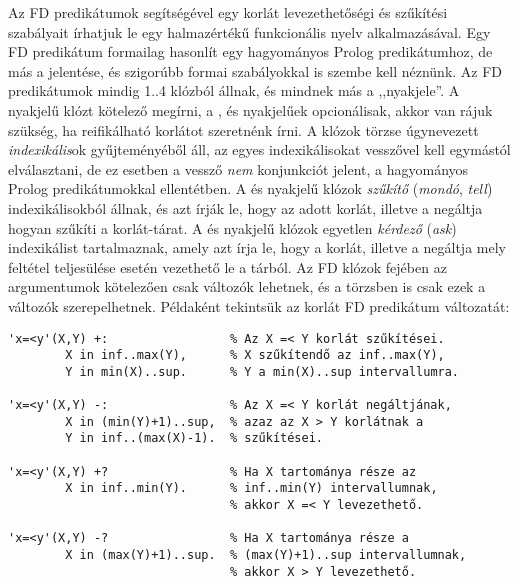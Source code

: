 Az FD predikátumok segítségével egy korlát levezethetőségi és szűkítési szabályait
írhatjuk le egy halmazértékű funkcionális nyelv alkalmazásával. Egy FD predikátum
formailag hasonlít egy hagyományos Prolog predikátumhoz, de más a jelentése, és
szigorúbb formai szabályokkal is szembe kell néznünk.
\br
Az FD predikátumok mindig 1..4 klózból állnak, és mindnek más a ,,nyakjele''. A
\cd{+:} nyakjelű klózt kötelező megírni, a \cd{-:},  és  nyakjelűek
opcionálisak, akkor van rájuk szükség, ha reifikálható korlátot szeretnénk írni.
A klózok törzse úgynevezett \emph{indexikális}ok gyűjteményéből áll, az egyes
indexikálisokat vesszővel kell egymástól elválasztani, de ez esetben a vessző
\emph{nem} konjunkciót jelent, a hagyományos Prolog predikátumokkal ellentétben.
A \cd{+:} és \cd{-:} nyakjelű klózok \emph{szűkítő} (\emph{mondó}, \emph{tell})
indexikálisokból állnak, és azt írják le, hogy az adott korlát, illetve a negáltja
hogyan szűkíti a korlát-tárat. A  és  nyakjelű klózok egyetlen
\emph{kérdező} (\emph{ask}) indexikálist tartalmaznak, amely azt írja le, hogy
a korlát, illetve a negáltja mely feltétel teljesülése esetén vezethető le a
tárból. Az FD klózok fejében az argumentumok kötelezően csak változók lehetnek,
és a törzsben is csak ezek a változók szerepelhetnek. Példaként tekintsük az
 korlát FD predikátum változatát:

\begin{verbatim}
'x=<y'(X,Y) +:                 % Az X =< Y korlát szűkítései.
        X in inf..max(Y),      % X szűkítendő az inf..max(Y),
        Y in min(X)..sup.      % Y a min(X)..sup intervallumra.

'x=<y'(X,Y) -:                 % Az X =< Y korlát negáltjának,
        X in (min(Y)+1)..sup,  % azaz az X > Y korlátnak a
        Y in inf..(max(X)-1).  % szűkítései.

'x=<y'(X,Y) +?                 % Ha X tartománya része az 
        X in inf..min(Y).      % inf..min(Y) intervallumnak, 
                               % akkor X =< Y levezethető.

'x=<y'(X,Y) -?                 % Ha X tartománya része a 
        X in (max(Y)+1)..sup.  % (max(Y)+1)..sup intervallumnak, 
                               % akkor X > Y levezethető.
\end{verbatim}

